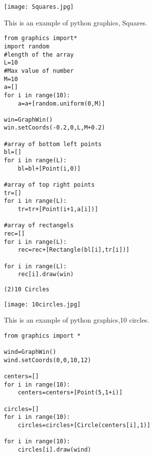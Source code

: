 \begin{marginfigure}%
  \texttt{[image: Squares.jpg]}
  \caption{This is an example of python graphics, Squares.}
  \label{fig:marginfig}
\end{marginfigure}

\begin{shaded}
\begin{verbatim}
from graphics import*
import random
#length of the array
L=10
#Max value of number
M=10
a=[]
for i in range(10):
    a=a+[random.uniform(0,M)]

win=GraphWin()
win.setCoords(-0.2,0,L,M+0.2)

#array of bottom left points
bl=[]
for i in range(L):
    bl=bl+[Point(i,0)]

#array of top right points
tr=[]
for i in range(L):
    tr=tr+[Point(i+1,a[i])]

#array of rectangels
rec=[]
for i in range(L):
    rec=rec+[Rectangle(bl[i],tr[i])]

for i in range(L):
    rec[i].draw(win)

\end{verbatim}
\end{shaded}


\begin{verbatim}
(2)10 Circles
\end{verbatim}


\begin{marginfigure}%
  \texttt{[image: 10circles.jpg]}
  \caption{This is an example of python graphics,10 circles.}
  \label{fig:marginfig}
\end{marginfigure}

\begin{shaded}
\begin{verbatim}
from graphics import *

wind=GraphWin()
wind.setCoords(0,0,10,12)

centers=[]
for i in range(10):
    centers=centers+[Point(5,1+i)]

circles=[]
for i in range(10):
    circles=circles+[Circle(centers[i],1)]

for i in range(10):
    circles[i].draw(wind)

\end{verbatim}
\end{shaded}


